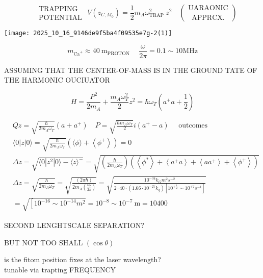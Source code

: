 $$
\begin{aligned}
& \text { TRAPPING } \\
& \text { POTENTIAL }
\end{aligned} V\left(z_{C, M_{0}}\right)=\frac{1}{2} m_{A} \omega_{\text {TRAP }}^{2} z^{2} \quad\binom{\text { UARAONIC }}{\text { APPRCX. }}
$$

\begin{center}
\texttt{[image: 2025\_10\_16\_9146de9f5ba4f09535e7g-2(1)]}
\end{center}

$$
m_{\mathrm{Ca}^{+}} \approx 40 \mathrm{~m}_{\text {PROTON }} \quad \frac{\omega}{2 \pi}=0.1 \sim 10 \mathrm{MHz}
$$

ASSUMING THAT THE CENTER-OF-MASS IS IN THE GROUND TATE OF THE HARMONIC OUCIUATOR

$$
H=\frac{P^{2}}{2 m_{A}}+\frac{m_{A} \omega_{T}^{2}}{2} z^{2}=\hbar \omega_{T}\left(a^{+} a+\frac{1}{2}\right)
$$

$$
\begin{aligned}
& Q z=\sqrt{\frac{\hbar}{2 m_{A} \omega_{T}}}\left(a+a^{+}\right) \quad P=\sqrt{\frac{\hbar m_{A} \omega_{T}}{2}} i\left(a^{+}-a\right) \quad \text { outcomes } \\
&\langle 0| z|0\rangle=\sqrt{\frac{\hbar}{2 m_{A} \omega_{T}}}\left(\langle\phi\rangle+\left\langle\phi^{+}\right\rangle\right)=0 \\
& \Delta z=\sqrt{\langle 0| z^{2}|0\rangle-\langle z\rangle^{-}}=\sqrt{\left(\frac{\hbar}{2 m_{A} \omega_{T}}\right)\left(\left\langle\phi^{*}\right\rangle+\left\langle a^{+} a\right\rangle+\left\langle a a^{+}\right\rangle+\left\langle\phi^{+}\right\rangle\right)} \\
& \Delta z=\sqrt{\frac{\hbar}{2 m_{A} \omega_{T}}}=\sqrt{\frac{(2 \pi \hbar)}{2 m_{A}\left(\frac{\omega_{T}}{2 \pi}\right)}}=\sqrt{\frac{10^{-34} k_{G} m^{2} s^{-2}}{2 \cdot 40 \cdot\left(1.66 \cdot 10^{-27} k_{g}\right)\left[10^{+\frac{1}{2}} \sim 10^{+7} s^{-1}\right]}} \\
&=\sqrt{\left[10^{-16} \sim 10^{-14} m^{2}\right.}=10^{-8} \sim 10^{-7} \mathrm{~m}=10400
\end{aligned}
$$

SECOND LENGHTSCALE SEPARATION?

\begin{displayquote}
BUT NOT TOO SHALL $(\cos \theta)$
\end{displayquote}

is the fitom position fixes at the laser wavelength?\\
tunable via trapting FREQUENCY

